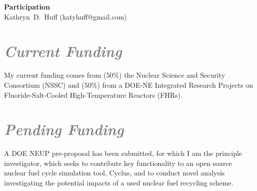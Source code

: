 \documentclass[a4paper, 12pt]{article}
\makeatletter
\newcommand{\authorname}{Kathryn~D.~Huff }
\newcommand{\authoremail}{katyhuff@gmail.com}
\newcommand{\authorsite}{katyhuff.github.com}
\makeatother
\begin{document}
\pagestyle{fancy}
\lhead{\textcolor{gray}{\it \authorname}}
\rhead{\textcolor{gray}{\thepage/\totalpages{}}}
\renewcommand{\headrulewidth}{0pt} 
\renewcommand{\footrulewidth}{0pt} 
\fancyfoot[C]{\footnotesize \textcolor{gray}{\authorsite}} 

\begin{center}
{\LARGE \bf Participation}\\
\vspace*{0.1cm}
{\normalsize \authorname (\authoremail)}
\end{center}





\section*{\textcolor{gray}{\it Current Funding}}
My current funding comes from ($50\%$) the Nuclear Science and Security 
Consortium (NSSC) and ($50\%$) from a DOE-NE Integrated Research Projects on 
Fluoride-Salt-Cooled High-Temperature Reactors (FHRs).  

\section*{\textcolor{gray}{\it Pending Funding}}
A DOE NEUP pre-proposal has been submitted, for which I am the principle
investigator, which seeks to contribute key functionality to an open source
nuclear fuel cycle simulation tool, Cyclus, and to conduct novel analysis
investigating the potential impacts of a used nuclear fuel recycling scheme. 
\end{document}

